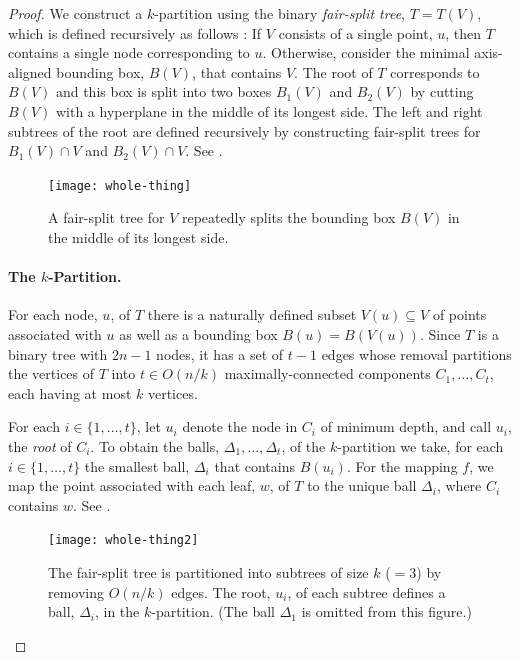 \documentclass{patmorin}
\begin{document}
\begin{proof}
  We construct a $k$-partition using the binary \emph{fair-split
  tree}, $T=T(V)$, which is defined recursively as follows
  \cite{callahan.kosaraju:decomposition}: If $V$ consists of a single
  point, $u$, then $T$ contains a single node corresponding to $u$.
  Otherwise, consider the minimal axis-aligned bounding box, $B(V)$,
  that contains $V$.  The root of $T$ corresponds to $B(V)$ and this
  box is split into two boxes $B_1(V)$ and $B_2(V)$ by cutting $B(V)$
  with a hyperplane in the middle of its longest side.  The left and
  right subtrees of the root are defined recursively by constructing
  fair-split trees for $B_1(V)\cap V$ and $B_2(V)\cap V$. See .

  \begin{figure}
    \begin{center}
      \texttt{[image: whole-thing]}
    \end{center}
    \caption{A fair-split tree for $V$ repeatedly splits the bounding
      box $B(V)$ in the middle of its longest side.}
  \end{figure}

  \paragraph{The $k$-Partition.}
  For each node, $u$, of $T$ there is a naturally defined subset
  $V(u)\subseteq V$ of points associated with $u$ as well as a bounding
  box $B(u)=B(V(u))$.  Since $T$ is a binary tree with $2n-1$ nodes, it
  has a set of $t-1$ edges whose removal partitions the vertices of $T$
  into $t\in O(n/k)$ maximally-connected components $C_1,\ldots,C_t$,
  each having at most $k$ vertices.

  For each $i\in\{1,\ldots,t\}$, let $u_i$ denote the node in $C_i$ of
  minimum depth, and call $u_i$, the \emph{root} of $C_i$.
  To obtain the balls, $\Delta_1,\ldots,\Delta_t$, of the $k$-partition we
  take, for each $i\in\{1,\ldots,t\}$ the smallest ball, $\Delta_i$ that
  contains $B(u_i)$.  For the mapping $f$, we map the point associated
  with each leaf, $w$, of $T$ to the unique ball $\Delta_i$, where $C_i$
  contains $w$. See .

  \begin{figure}
    \begin{center}
      \texttt{[image: whole-thing2]}
    \end{center}
    \caption{The fair-split tree is partitioned into subtrees of size
    $k$ (${}=3$) by removing $O(n/k)$ edges.  The root, $u_i$, of each subtree
    defines a ball, $\Delta_i$, in the $k$-partition. (The ball $\Delta_1$
    is omitted from this figure.)}
  \end{figure}



\end{proof}
\end{document}
